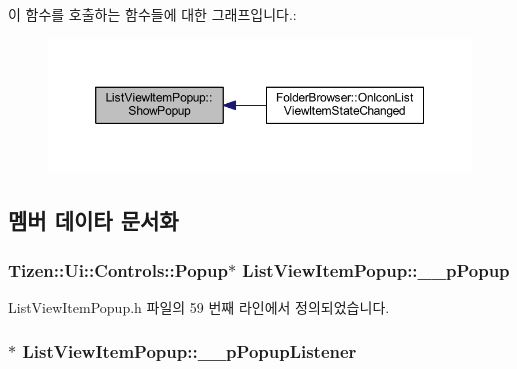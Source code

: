 이 함수를 호출하는 함수들에 대한 그래프입니다.\+:
\nopagebreak
\begin{figure}[H]
\begin{center}
\leavevmode
\includegraphics[width=350pt]{class_list_view_item_popup_a6e5821dcd07b75edad9775650c8d5a63_icgraph}
\end{center}
\end{figure}




\subsection{멤버 데이타 문서화}
\hypertarget{class_list_view_item_popup_ae2763988a34f0ecbfb81aeb3cc2ca59a}{
\subsubsection[{\+\_\+\+\_\+p\+Popup}]{\setlength{\rightskip}{0pt plus 5cm}Tizen\+::\+Ui\+::\+Controls\+::\+Popup$\ast$ List\+View\+Item\+Popup\+::\+\_\+\+\_\+p\+Popup\hspace{0.3cm}{\ttfamily [private]}}}\label{class_list_view_item_popup_ae2763988a34f0ecbfb81aeb3cc2ca59a}


List\+View\+Item\+Popup.\+h 파일의 59 번째 라인에서 정의되었습니다.

\hypertarget{class_list_view_item_popup_a42979e0b89cd38da4f6046e678d21437}{
\subsubsection[{\+\_\+\+\_\+p\+Popup\+Listener}]{$\ast$ List\+View\+Item\+Popup\+::\+\_\+\+\_\+p\+Popup\+Listener\hspace{0.3cm}{\ttfamily [private]}}}\label{class_list_view_item_popup_a42979e0b89cd38da4f6046e678d21437}


